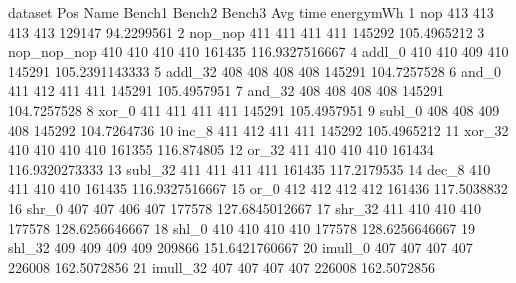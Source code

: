 \begin{filecontents}{dataset}
Pos	Name	Bench1	Bench2	Bench3	Avg	time	energymWh
1	nop	413	413	413	413	129147	94.2299561
2	nop\_nop	411	411	411	411	145292	105.4965212
3	nop\_nop\_nop	410	410	410	410	161435	116.9327516667
4	addl\_0	410	410	409	410	145291	105.2391143333
5	addl\_32	408	408	408	408	145291	104.7257528
6	and\_0	411	412	411	411	145291	105.4957951
7	and\_32	408	408	408	408	145291	104.7257528
8	xor\_0	411	411	411	411	145291	105.4957951
9	subl\_0	408	408	409	408	145292	104.7264736
10	inc\_8	411	412	411	411	145292	105.4965212
11	xor\_32	410	410	410	410	161355	116.874805
12	or\_32	411	410	410	410	161434	116.9320273333
13	subl\_32	411	411	411	411	161435	117.2179535
14	dec\_8	410	411	410	410	161435	116.9327516667
15	or\_0	412	412	412	412	161436	117.5038832
16	shr\_0	407	407	406	407	177578	127.6845012667
17	shr\_32	411	410	410	410	177578	128.6256646667
18	shl\_0	410	410	410	410	177578	128.6256646667
19	shl\_32	409	409	409	409	209866	151.6421760667
20	imull\_0	407	407	407	407	226008	162.5072856
21	imull\_32	407	407	407	407	226008	162.5072856
\end{filecontents}




